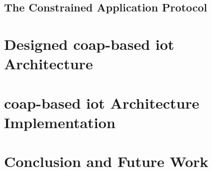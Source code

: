 \documentclass[conference]{IEEEtran}
\begin{document}
\subsection{The Constrained Application Protocol}


\section{Designed \gls{coap}-based \gls{iot} Architecture}



\section{\gls{coap}-based \gls{iot} Architecture Implementation}


\section{Conclusion and Future Work}




\label{app:A}
\inputminted[fontsize=\footnotesize,linenos,escapeinside=||,tabsize=2,breaklines]{python}{../rpi-coap/rpi-coap.py}

\printbibliography
\end{document}
